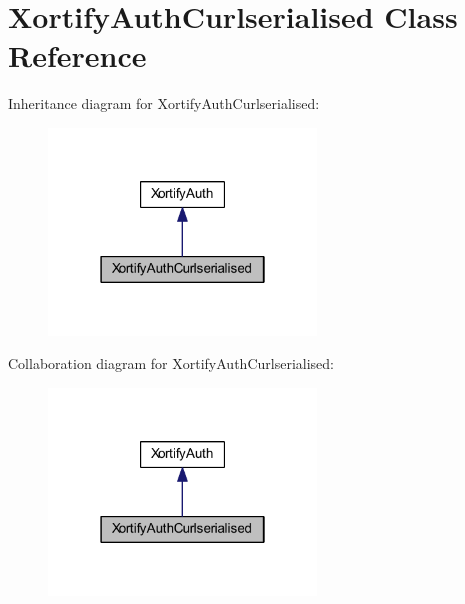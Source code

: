 \hypertarget{class_xortify_auth_curlserialised}{\section{Xortify\-Auth\-Curlserialised Class Reference}
\label{class_xortify_auth_curlserialised}
}


Inheritance diagram for Xortify\-Auth\-Curlserialised\-:
\nopagebreak
\begin{figure}[H]
\begin{center}
\leavevmode
\includegraphics[width=202pt]{class_xortify_auth_curlserialised__inherit__graph}
\end{center}
\end{figure}


Collaboration diagram for Xortify\-Auth\-Curlserialised\-:
\nopagebreak
\begin{figure}[H]
\begin{center}
\leavevmode
\includegraphics[width=202pt]{class_xortify_auth_curlserialised__coll__graph}
\end{center}
\end{figure}
